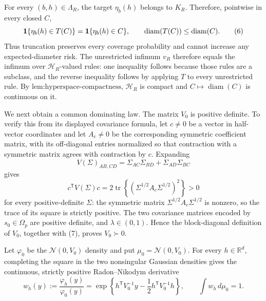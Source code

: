 For every \((b,h)\in\Lambda_R\), the target \(\eta_b(h)\) belongs to \(K_R\).  Therefore, pointwise in every closed \(C\),
\[
 {\bf1}\{\eta_b(h)\in T(C)\}={\bf1}\{\eta_b(h)\in C\},
 \qquad
 \operatorname{diam}(T(C))\le\operatorname{diam}(C).
\tag{6}
\]
Thus truncation preserves every coverage probability and cannot increase any expected-diameter risk.  The unrestricted infimum \(v_R\) therefore equals the infimum over \(\mathcal H_R\)-valued rules: one inequality follows because those rules are a subclass, and the reverse inequality follows by applying \(T\) to every unrestricted rule.  By \(\text{lem:hyperspace-compactness}\), \(\mathcal H_R\) is compact and \(C\mapsto\operatorname{diam}(C)\) is continuous on it.

We next obtain a common dominating law.  The matrix \(V_0\) is positive definite.  To verify this from its displayed covariance formula, let \(c\ne0\) be a vector in half-vector coordinates and let \(A_c\ne0\) be the corresponding symmetric coefficient matrix, with its off-diagonal entries normalized so that contraction with a symmetric matrix agrees with contraction by \(c\).  Expanding
\[
 V(\Sigma)_{AB,CD}=\Sigma_{AC}\Sigma_{BD}+\Sigma_{AD}\Sigma_{BC}
\]
gives
\[
 c^{\mathsf T}V(\Sigma)c
 =2\operatorname{tr}\!\left\{(\Sigma^{1/2}A_c\Sigma^{1/2})^2\right\}>0
\tag{7}
\]
for every positive-definite \(\Sigma\): the symmetric matrix \(\Sigma^{1/2}A_c\Sigma^{1/2}\) is nonzero, so the trace of its square is strictly positive.  The two covariance matrices encoded by \(s_0\in\Omega_p\) are positive definite, and \(\lambda\in(0,1)\).  Hence the block-diagonal definition of \(V_0\), together with (7), proves \(V_0\succ0\).

Let \(\varphi_0\) be the \(\mathcal N(0,V_0)\) density and put \(\mu_0=\mathcal N(0,V_0)\).  For every \(h\in\mathbb R^d\), completing the square in the two nonsingular Gaussian densities gives the continuous, strictly positive Radon--Nikodym derivative
\[
 w_h(y):=\frac{\varphi_h(y)}{\varphi_0(y)}
 =\exp\!\left\{h^{\mathsf T}V_0^{-1}y
 -\frac12h^{\mathsf T}V_0^{-1}h\right\},
 \qquad
 \int w_h\,d\mu_0=1.
\tag{8}
\]

